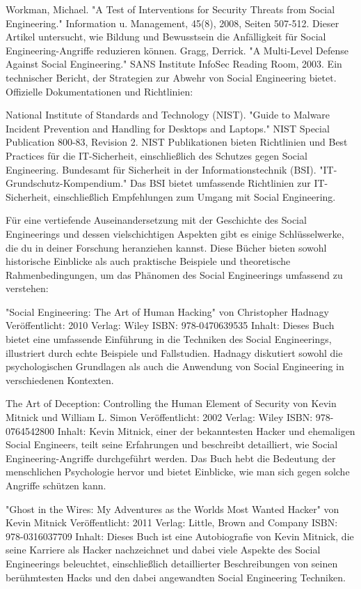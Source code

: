 Workman, Michael. "A Test of Interventions for Security Threats from Social Engineering." Information u. Management, 45(8), 2008, Seiten 507-512. Dieser Artikel untersucht, wie Bildung und Bewusstsein die Anfälligkeit für Social Engineering-Angriffe reduzieren können.
Gragg, Derrick. "A Multi-Level Defense Against Social Engineering." SANS Institute InfoSec Reading Room, 2003. Ein technischer Bericht, der Strategien zur Abwehr von Social Engineering bietet.
Offizielle Dokumentationen und Richtlinien:

National Institute of Standards and Technology (NIST). "Guide to Malware Incident Prevention and Handling for Desktops and Laptops." NIST Special Publication 800-83, Revision 2. NIST Publikationen bieten Richtlinien und Best Practices für die IT-Sicherheit, einschließlich des Schutzes gegen Social Engineering.
Bundesamt für Sicherheit in der Informationstechnik (BSI). "IT-Grundschutz-Kompendium." Das BSI bietet umfassende Richtlinien zur IT-Sicherheit, einschließlich Empfehlungen zum Umgang mit Social Engineering.

Für eine vertiefende Auseinandersetzung mit der Geschichte des Social Engineerings und dessen vielschichtigen Aspekten gibt es einige Schlüsselwerke, die du in deiner Forschung heranziehen kannst. Diese Bücher bieten sowohl historische Einblicke als auch praktische Beispiele und theoretische Rahmenbedingungen, um das Phänomen des Social Engineerings umfassend zu verstehen:

"Social Engineering: The Art of Human Hacking" von Christopher Hadnagy
Veröffentlicht: 2010
Verlag: Wiley
ISBN: 978-0470639535
Inhalt: Dieses Buch bietet eine umfassende Einführung in die Techniken des Social Engineerings, illustriert durch echte Beispiele und Fallstudien. Hadnagy diskutiert sowohl die psychologischen Grundlagen als auch die Anwendung von Social Engineering in verschiedenen Kontexten.


The Art of Deception: Controlling the Human Element of Security von Kevin Mitnick und William L. Simon
Veröffentlicht: 2002
Verlag: Wiley
ISBN: 978-0764542800
Inhalt: Kevin Mitnick, einer der bekanntesten Hacker und ehemaligen Social Engineers, teilt seine Erfahrungen und beschreibt detailliert, wie Social Engineering-Angriffe durchgeführt werden. Das Buch hebt die Bedeutung der menschlichen Psychologie hervor und bietet Einblicke, wie man sich gegen solche Angriffe schützen kann.


"Ghost in the Wires: My Adventures as the Worlds Most Wanted Hacker" von Kevin Mitnick
Veröffentlicht: 2011
Verlag: Little, Brown and Company
ISBN: 978-0316037709
Inhalt: Dieses Buch ist eine Autobiografie von Kevin Mitnick, die seine Karriere als Hacker nachzeichnet und dabei viele Aspekte des Social Engineerings beleuchtet, einschließlich detaillierter Beschreibungen von seinen berühmtesten Hacks und den dabei angewandten Social Engineering Techniken.

